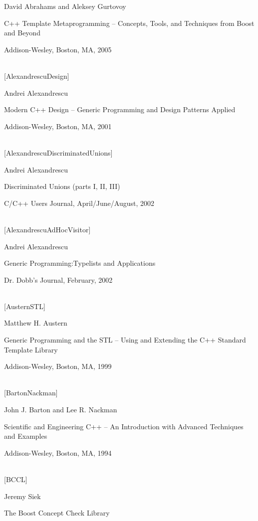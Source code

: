 David Abrahams and Aleksey Gurtovoy

C++ Template Metaprogramming – Concepts, Tools, and Techniques from Boost and Beyond
 
Addison-Wesley, Boston, MA, 2005

\hspace*{\fill} \\ %
{[AlexandrescuDesign]}

Andrei Alexandrescu

Modern C++ Design – Generic Programming and Design Patterns Applied

Addison-Wesley, Boston, MA, 2001

\hspace*{\fill} \\ %
{[AlexandrescuDiscriminatedUnions]}

Andrei Alexandrescu

Discriminated Unions (parts I, II, III)

C/C++ Users Journal, April/June/August, 2002

\hspace*{\fill} \\ %
{[AlexandrescuAdHocVisitor]}

Andrei Alexandrescu

Generic Programming:Typelists and Applications

Dr. Dobb’s Journal, February, 2002

\hspace*{\fill} \\ %
{[AusternSTL]}

Matthew H. Austern

Generic Programming and the STL – Using and Extending the C++ Standard Template Library

Addison-Wesley, Boston, MA, 1999

\hspace*{\fill} \\ %
{[BartonNackman]}

John J. Barton and Lee R. Nackman

Scientific and Engineering C++ – An Introduction with Advanced Techniques and Examples

Addison-Wesley, Boston, MA, 1994

\hspace*{\fill} \\ %
{[BCCL]}

Jeremy Siek

The Boost Concept Check Library

